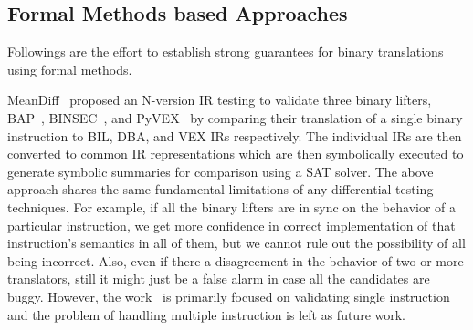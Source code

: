 %
%

\subsection{Formal Methods based Approaches}
Followings are the effort to establish strong guarantees for binary
translations using formal methods.

MeanDiff~\cite{ASE2017} proposed an N-version IR testing to validate three
binary lifters, BAP~\cite{BAP:CAV11}, BINSEC~\cite{BINSEC2011}, and
PyVEX~\cite{PYVEX} by comparing their translation of a single binary
instruction to BIL, DBA, and VEX IRs respectively. The individual IRs are then
converted to common IR representations which are then symbolically executed to
generate symbolic summaries for comparison using a SAT solver.  The above
approach shares the same fundamental limitations of any differential testing
techniques. For example, if all the binary lifters are in  sync
on the behavior of a particular instruction, we get more confidence in correct
 implementation of that instruction's semantics in all of them, but we
cannot rule
out the possibility of all being incorrect. Also, even if there a disagreement
in the behavior of two or more translators, still it might just be a false
alarm
in case all the candidates are buggy. However, the work~\cite{ASE2017}
is primarily focused on validating single
instruction and the problem
of handling multiple instruction is left as future work.

